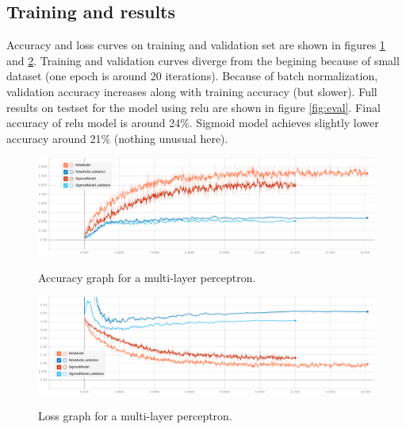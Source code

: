 \documentclass[a4paper]{article}
\begin{document}
\subsection{Training and results}
Accuracy and loss curves on training and validation set are shown in figures \ref{fig:training_accuracy} and \ref{fig:training_loss}.
Training and validation curves diverge from the begining because of small dataset (one epoch is around 20 iterations).
Because of batch normalization, validation accuracy increases along with training accuracy (but slower).
Full results on testset for the model using relu are shown in figure \ref{fig:eval}.
Final accuracy of relu model is around 24\%.
Sigmoid model achieves slightly lower accuracy around 21\% (nothing unusual here).

\begin{figure}[H]
    \caption[]{Accuracy graph for a multi-layer perceptron.}
    \centering
    \includegraphics[page=2,width=1.0\textwidth]{training_accuracy.png}
    \label{fig:training_accuracy}
\end{figure}

\begin{figure}[H]
    \caption[]{Loss graph for a multi-layer perceptron.}
    \centering
    \includegraphics[page=2,width=1.0\textwidth]{training_loss.png}
    \label{fig:training_loss}
\end{figure}
\end{document}
